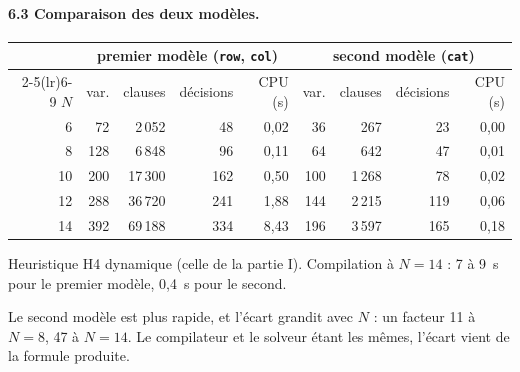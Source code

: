 \documentclass[11pt,a4paper]{article}
\newcommand{\code}[1]{\texttt{#1}}
\begin{document}
\paragraph{6.3 Comparaison des deux modèles.}
\begin{center}
\begin{tabular}{r rrrr rrrr}
\toprule
 & \multicolumn{4}{c}{premier modèle (\code{row}, \code{col})} & \multicolumn{4}{c}{second modèle (\code{cat})} \\
\cmidrule(lr){2-5}\cmidrule(lr){6-9}
$N$ & var. & clauses & décisions & CPU (s) & var. & clauses & décisions & CPU (s) \\
\midrule
6  &  72 &  2\,052 &  48 & 0,02 &  36 &    267 &  23 & 0,00 \\
8  & 128 &  6\,848 &  96 & 0,11 &  64 &    642 &  47 & 0,01 \\
10 & 200 & 17\,300 & 162 & 0,50 & 100 & 1\,268 &  78 & 0,02 \\
12 & 288 & 36\,720 & 241 & 1,88 & 144 & 2\,215 & 119 & 0,06 \\
14 & 392 & 69\,188 & 334 & 8,43 & 196 & 3\,597 & 165 & 0,18 \\
\bottomrule
\end{tabular}

\smallskip
{\small Heuristique H4 dynamique (celle de la partie I). Compilation à $N=14$ : 7 à 9~s
pour le premier modèle, 0,4~s pour le second.}
\end{center}
Le second modèle est plus rapide, et l'écart grandit avec $N$ : un facteur 11 à $N = 8$,
47 à $N = 14$. Le compilateur et
le solveur étant les mêmes, l'écart vient de la formule produite.
\end{document}
